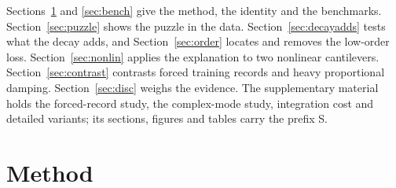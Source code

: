 \documentclass[preprint,12pt]{elsarticle}
\begin{document}
Sections~\ref{sec:method} and \ref{sec:bench} give the method, the identity and the benchmarks. Section~\ref{sec:puzzle} shows the puzzle in the data. Section~\ref{sec:decayadds} tests what the decay adds, and Section~\ref{sec:order} locates and removes the low-order loss. Section~\ref{sec:nonlin} applies the explanation to two nonlinear cantilevers. Section~\ref{sec:contrast} contrasts forced training records and heavy proportional damping. Section~\ref{sec:disc} weighs the evidence. The supplementary material holds the forced-record study, the complex-mode study, integration cost and detailed variants; its sections, figures and tables carry the prefix S.


\section{Method}\label{sec:method}
\end{document}
